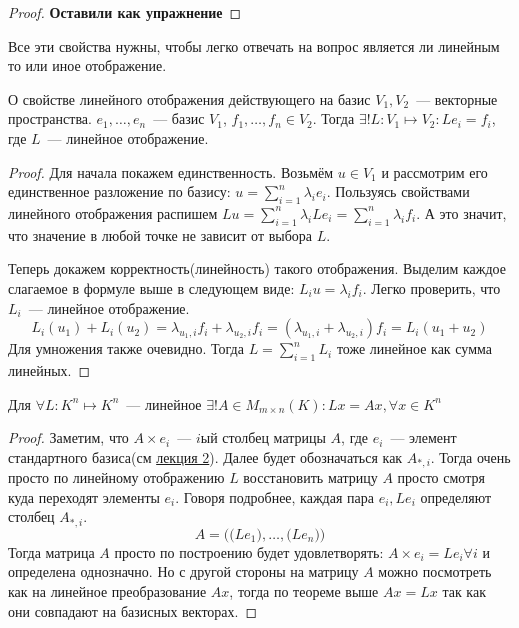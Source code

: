 \begin{proof}
    \textbf{Оставили как упражнение}
\end{proof}
\begin{motivation}
    Все эти свойства нужны, чтобы легко отвечать на вопрос является ли линейным то или иное отображение.
\end{motivation}
\begin{theorem}{О свойстве линейного отображения действующего на базис}
    $V_1, V_2$~--- векторные пространства. $e_1,\dots,e_n$~--- базис $V_1$, $f_1,\dots,f_n\in V_2$.
    Тогда $\exists! L: V_1\mapsto V_2\colon Le_i = f_i$, где $L$~--- линейное отображение.
\end{theorem}
\begin{proof}
    Для начала покажем единственность. Возьмём $u\in V_1$ и рассмотрим его единственное разложение по базису:
    $u = \sum\limits_{i=1}^{n}\lambda_ie_i$. Пользуясь свойствами линейного отображения распишем $Lu=
    \sum \limits_{i=1}^{n} \lambda_iLe_i = \sum \limits_{i=1}^{n} \lambda_i f_i$. А это значит, что значение
    в любой точке не зависит от выбора $L$.

    Теперь докажем корректность(линейность) такого отображения. Выделим каждое слагаемое в формуле выше 
    в следующем виде: $L_iu = \lambda_if_i$. Легко проверить, что $L_i$~--- линейное отображение.
    $$L_i(u_1) + L_i(u_2) =
    \lambda_{u_1,i}f_i + \lambda_{u_2,i}f_i=
    (\lambda_{u_1,i}+\lambda_{u_2,i})f_i=L_i(u_1 + u_2)$$
    Для умножения также очевидно. Тогда $L = \sum\limits_{i=1}^{n} L_i$
    тоже линейное как сумма линейных.
\end{proof}
\begin{follow}
    Для $\forall L: K^n\mapsto K^n$~--- линейное 
    $\exists! A\in M_{m\times n}(K)\colon Lx = Ax,\forall x\in K^n$
\end{follow}
\begin{proof}
    Заметим, что $A\times e_i$~--- $i$ый столбец матрицы $A$, где $e_i$~--- элемент стандартного базиса(см \hyperref[2]{лекция 2}).
    Далее будет обозначаться как $A_{*,i}$. Тогда очень просто по линейному отображению $L$ восстановить
    матрицу $A$ просто смотря куда переходят элементы $e_i$.
    Говоря подробнее, каждая пара $e_i, Le_i$ определяют столбец $A_{*,i}$.
    $$A=\Big(\big(Le_1\big),\dots,\big(Le_n\big)\Big)$$
    Тогда матрица $A$ просто по построению будет удовлетворять: $A \times e_i = L e_i \forall i$
    и определена однозначно. Но с другой стороны на матрицу $A$ можно посмотреть как на линейное
    преобразование $Ax$, тогда по теореме выше $Ax=Lx$ так как они совпадают на базисных векторах.
\end{proof}
